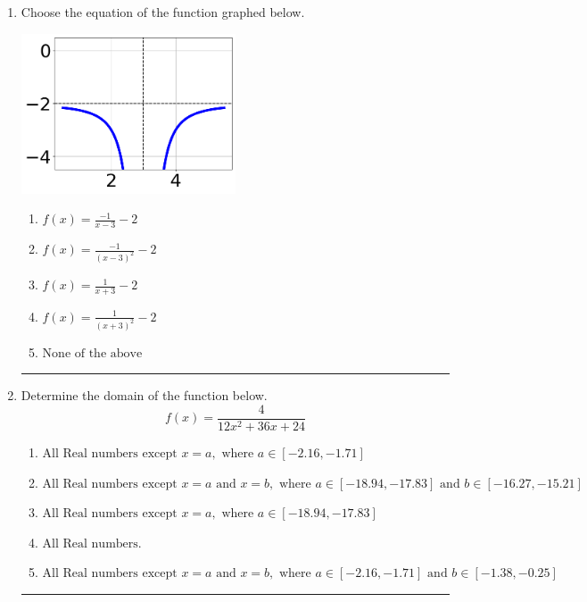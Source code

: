 \documentclass[14pt]{extbook}
\newcommand{\litem}[1]{\item#1\hspace*{-1cm}\rule{\textwidth}{0.4pt}}
\begin{document}
\begin{enumerate}
{\begin{enumerate}[label=\Alph*.]
\end{enumerate} }
\litem{
Choose the equation of the function graphed below.
\begin{center}
    \includegraphics[width=0.5\textwidth]{../Figures/rationalGraphToEquationCopyC.png}
\end{center}
\begin{enumerate}[label=\Alph*.]
\item \( f(x) = \frac{-1}{x - 3} - 2 \)
\item \( f(x) = \frac{-1}{(x - 3)^2} - 2 \)
\item \( f(x) = \frac{1}{x + 3} - 2 \)
\item \( f(x) = \frac{1}{(x + 3)^2} - 2 \)
\item \( \text{None of the above} \)

\end{enumerate} }
\litem{
Determine the domain of the function below.\[ f(x) = \frac{4}{12x^{2} +36 x + 24} \]\begin{enumerate}[label=\Alph*.]
\item \( \text{All Real numbers except } x = a, \text{ where } a \in [-2.16, -1.71] \)
\item \( \text{All Real numbers except } x = a \text{ and } x = b, \text{ where } a \in [-18.94, -17.83] \text{ and } b \in [-16.27, -15.21] \)
\item \( \text{All Real numbers except } x = a, \text{ where } a \in [-18.94, -17.83] \)
\item \( \text{All Real numbers.} \)
\item \( \text{All Real numbers except } x = a \text{ and } x = b, \text{ where } a \in [-2.16, -1.71] \text{ and } b \in [-1.38, -0.25] \)

\end{enumerate} }
\end{enumerate}
\end{document}
